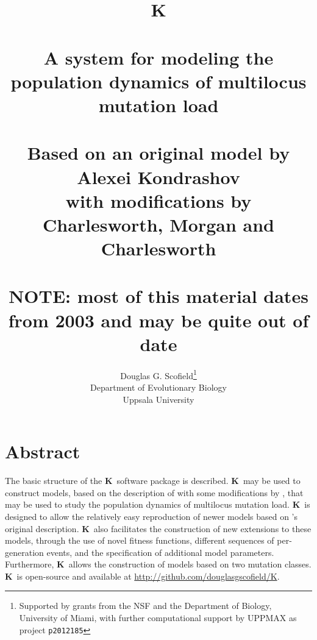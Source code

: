 \documentclass[10pt,twoside,a4paper,fleqn]{report}
\numberwithin{equation}{section}  %
\newcommand{\K}{{\bf K}}
\begin{document}
\title{\K \\ \  \\ A system for modeling the population dynamics of multilocus
mutation load \\ \  \\ \large Based on an original model by Alexei Kondrashov
\\ with modifications by Charlesworth, Morgan and Charlesworth \\ \  \\ NOTE:
most of this material dates from 2003 and may be quite out of date}

\author{Douglas G. Scofield\thanks{Supported by grants from the NSF and the
Department of Biology, University of Miami, with further computational support
by UPPMAX as project \texttt{p2012185}} \\ Department of Evolutionary Biology
\\ Uppsala University}

\date{}

\maketitle


\chapter*{Abstract}

The basic structure of the \K\ software package is described.  \K\ may be used
to construct models, based on the description of \citet{Kondrashov:1985:5375}
with some modifications by \citet{Charlesworth:1990:5337}, that may be used to
study the population dynamics of multilocus mutation load.  \K\ is designed to
allow the relatively easy reproduction of newer models based on
\citeauthor{Kondrashov:1985:5375}'s original description.  \K\ also facilitates
the construction of new extensions to these models, through the use of novel
fitness functions, different sequences of per-generation events, and the
specification of additional model parameters.  Furthermore, \K\ allows the
construction of models based on two mutation classes.  \K\ is open-source and
available at \url{http://github.com/douglasgscofield/K}.
\end{document}
